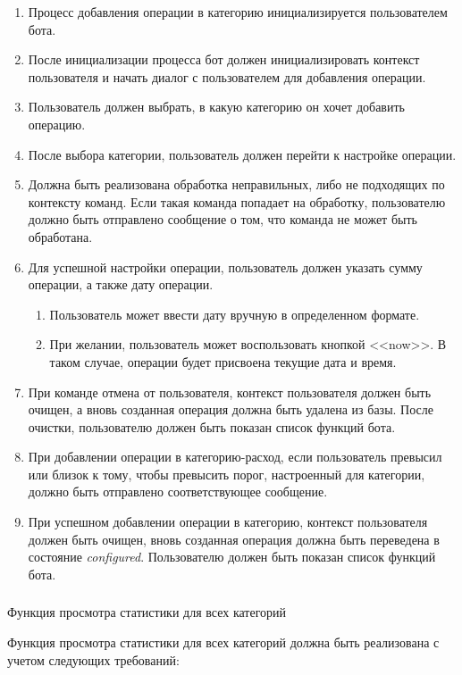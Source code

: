 \begin{enumerate}
	\item Процесс добавления операции в категорию инициализируется пользователем бота.
	\item После инициализации процесса бот должен инициализировать контекст пользователя и начать диалог с пользователем для добавления операции.
	\item Пользователь должен выбрать, в какую категорию он хочет добавить операцию.
	\item После выбора категории, пользователь должен перейти к настройке операции.
	\item Должна быть реализована обработка неправильных, либо не подходящих по контексту команд. Если такая команда попадает на обработку, пользователю должно быть отправлено сообщение о том, что команда не может быть обработана.
	\item Для успешной настройки операции, пользователь должен указать сумму операции, а также дату операции.
	\begin{enumerate}
		\item Пользователь может ввести дату вручную в определенном формате.
		\item При желании, пользователь может воспользовать кнопкой <<now>>. В таком случае, операции будет присвоена текущие дата и время.
	\end{enumerate}
	\item При команде отмена от пользователя, контекст пользователя должен быть очищен, а вновь созданная операция должна быть удалена из базы. После очистки, пользователю должен быть показан список функций бота.
	\item При добавлении операции в категорию-расход, если пользователь превысил или близок к тому, чтобы превысить порог, настроенный для категории, должно быть отправлено соответствующее сообщение.
	\item При успешном добавлении операции в категорию, контекст пользователя должен быть очищен, вновь созданная операция должна быть переведена в состояние \emph{configured}. Пользователю должен быть показан список функций бота.
\end{enumerate}

\subsubsection{} Функция просмотра статистики для всех категорий
\label{sec:domain:specification:showallstats}

Функция просмотра статистики для всех категорий должна быть реализована с учетом следующих требований:

